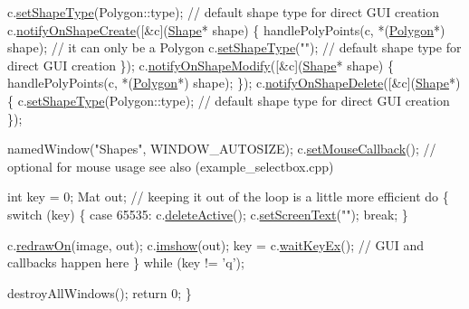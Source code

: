 \begin{DoxyCode}
    c.\hyperlink{classcanvascv_1_1Canvas_ac61735c6f4cb6a88d84331540ab25d39}{setShapeType}(Polygon::type); \textcolor{comment}{// default shape type for direct GUI creation}
    c.\hyperlink{classcanvascv_1_1Canvas_a64a459b16965e23de992cd2a301c68f4}{notifyOnShapeCreate}([&c](\hyperlink{classcanvascv_1_1Shape}{Shape}* shape)
    \{
        handlePolyPoints(c, *(\hyperlink{classcanvascv_1_1Polygon}{Polygon}*) shape); \textcolor{comment}{// it can only be a Polygon}
        c.\hyperlink{classcanvascv_1_1Canvas_ac61735c6f4cb6a88d84331540ab25d39}{setShapeType}(\textcolor{stringliteral}{""}); \textcolor{comment}{// default shape type for direct GUI creation}
    \});
    c.\hyperlink{classcanvascv_1_1Canvas_a5a6da8ae08b08a20d7fe15564bda5515}{notifyOnShapeModify}([&c](\hyperlink{classcanvascv_1_1Shape}{Shape}* shape)
    \{
        handlePolyPoints(c, *(\hyperlink{classcanvascv_1_1Polygon}{Polygon}*) shape);
    \});
    c.\hyperlink{classcanvascv_1_1Canvas_a1e7c26b39fd247e85941a6542f1b94c3}{notifyOnShapeDelete}([&c](\hyperlink{classcanvascv_1_1Shape}{Shape}*)
    \{
        c.\hyperlink{classcanvascv_1_1Canvas_ac61735c6f4cb6a88d84331540ab25d39}{setShapeType}(Polygon::type); \textcolor{comment}{// default shape type for direct GUI creation}
    \});

    namedWindow(\textcolor{stringliteral}{"Shapes"}, WINDOW\_AUTOSIZE);
    c.\hyperlink{classcanvascv_1_1Canvas_acf6e5d4b40aec610b0dc8c4f6bf93ac1}{setMouseCallback}(); \textcolor{comment}{// optional for mouse usage see also (example\_selectbox.cpp)}

    \textcolor{keywordtype}{int} key = 0;
    Mat out; \textcolor{comment}{// keeping it out of the loop is a little more efficient}
    \textcolor{keywordflow}{do}
    \{
        \textcolor{keywordflow}{switch} (key)
        \{
        \textcolor{keywordflow}{case} 65535:
            c.\hyperlink{classcanvascv_1_1Canvas_a2fb88addb88a21757d4272e64acd30ae}{deleteActive}();
            c.\hyperlink{classcanvascv_1_1Canvas_aaedea276b82a8a4cfc0895ae81113cfd}{setScreenText}(\textcolor{stringliteral}{""});
            \textcolor{keywordflow}{break};
        \}

        c.\hyperlink{classcanvascv_1_1Canvas_a018c66e277de7904b8146ea3f3feebdd}{redrawOn}(image, out);
        c.\hyperlink{classcanvascv_1_1Canvas_acaf9494a5668046dd0a8908aa97a7a43}{imshow}(out);
        key = c.\hyperlink{classcanvascv_1_1Canvas_a59397db05f5d9e45264f626f6a2ae528}{waitKeyEx}(); \textcolor{comment}{// GUI and callbacks happen here}
    \} \textcolor{keywordflow}{while} (key != \textcolor{charliteral}{'q'});

    destroyAllWindows();
    \textcolor{keywordflow}{return} 0;
\}
\end{DoxyCode}
